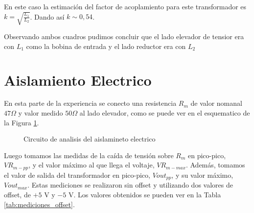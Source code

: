 En este caso la estimación del factor de acoplamiento para este transformador es $k = \sqrt{\frac{L_1}{L_2}}$. Dando así $k \sim 0,54$. 

Observando ambos cuadros pudimos concluir que el lado elevador de tensior era con $L_1$ como la bobina de entrada y el lado reductor era con $L_2$



\section{Aislamiento Electrico}
En esta parte de la experiencia se conecto una resistencia $R_m$ de valor nomanal $47 \Omega$ y valor medido $50\Omega$ al lado elevador, como se puede ver en el esquematico de la Figura \ref{fig:aislamiento_electrico}. 
\begin{figure}[H]
    \centering
    \caption{Circuito de analisis del aislamineto electrico}
    \label{fig:aislamiento_electrico}
\end{figure}

Luego tomamos las medidas de la caída de tensión sobre $R_m$ en pico-pico, $VR_{m-pp}$, y el valor máximo al que llega el voltaje, $VR_{m-max}$. Además, tomamos el valor de salida del transformador en pico-pico, $Vout_{pp}$, y su valor máximo, $Vout_{max}$. Estas mediciones se realizaron sin offset y utilizando dos valores de offset, de $+5$ V y $-5$ V. Los valores obtenidos se pueden ver en la Tabla \ref{tab:mediciones_offset}.

